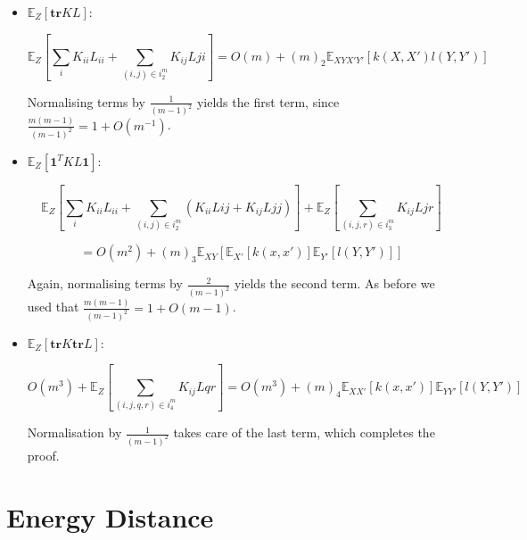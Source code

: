 \begin{itemize}


\item $\mathbb{E}_{Z}[\textbf{tr}KL]$:
\vspace{5mm}

$$
\mathbb{E}_{Z}[\sum_{i}K_{ii}L_{ii} + \sum_{(i,j)\in i_{2}^{m}}K_{ij}L{ji}] = O(m) +(m)_{2}\mathbb{E}_{XYX'Y'}[k(X,X')l(Y,Y')]
$$

Normalising terms by $\frac{1}{(m−1)^{2}}$ yields the first term, since $\frac{m(m−1)}{(m−1)^{2}}=1+O(m^{−1})$.

\item $\mathbb{E}_{Z}[\mathbf{1}^{T}KL\mathbf{1}]$:
\vspace{5mm}

$$
\mathbb{E}_{Z}[\sum_{i}K_{ii}L_{ii} + \sum_{(i,j)\in i_{2}^{m}}(K_{ii}L{ij} + K_{ij}L{jj})]  + \mathbb{E}_{Z}[\sum_{(i,j,r)\in i_{3}^{m}} K_{ij}L{jr}] $$

$$= O(m^{2}) +(m)_{3}\mathbb{E}_{XY}[\mathbb{E}_{X'}[k(x,x')]\mathbb{E}_{Y'}[l(Y,Y')]]
$$

Again, normalising terms by $\frac{2}{(m−1)^{2}}$ yields the second term. As before we used that  $\frac{m(m−1)}{(m−1)^{2}}=1+O(m−1)$.

\item $\mathbb{E}_{Z}[\textbf{tr}K\textbf{tr}L]$:
\vspace{5mm}

$$
O(m^{3}) + \mathbb{E}_{Z}[\sum_{(i,j,q,r)\in i_{4}^{m}} K_{ij}L{qr}] = O(m^{3}) + 
(m)_{4}\mathbb{E}_{XX'}[k(x,x')]\mathbb{E}_{YY'}[l(Y,Y')]
$$

Normalisation by $\frac{1}{(m−1)^{2}}$ takes care of the last term, which completes the proof.
\end{itemize}
\newpage
\section{Energy Distance\label{P:ED}}

